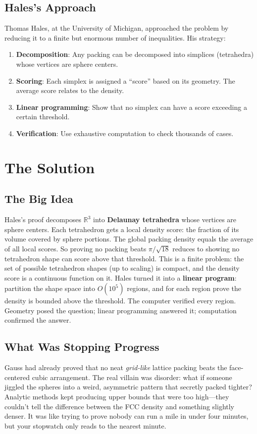 \subsection{Hales's Approach}

Thomas Hales, at the University of Michigan, approached the problem by reducing it to a finite but enormous number of inequalities. His strategy:

\begin{enumerate}
\item \textbf{Decomposition}: Any packing can be decomposed into simplices (tetrahedra) whose vertices are sphere centers.
\item \textbf{Scoring}: Each simplex is assigned a ``score'' based on its geometry. The average score relates to the density.
\item \textbf{Linear programming}: Show that no simplex can have a score exceeding a certain threshold.
\item \textbf{Verification}: Use exhaustive computation to check thousands of cases.
\end{enumerate}

\section{The Solution}

\subsection{The Big Idea}
Hales's proof decomposes $\mathbb{R}^3$ into \textbf{Delaunay tetrahedra} whose vertices are sphere centers. Each tetrahedron gets a local density score: the fraction of its volume covered by sphere portions. The global packing density equals the average of all local scores. So proving no packing beats $\pi/\sqrt{18}$ reduces to showing no tetrahedron shape can score above that threshold. This is a finite problem: the set of possible tetrahedron shapes (up to scaling) is compact, and the density score is a continuous function on it. Hales turned it into a \textbf{linear program}: partition the shape space into $O(10^5)$ regions, and for each region prove the density is bounded above the threshold. The computer verified every region. Geometry posed the question; linear programming answered it; computation confirmed the answer.

\subsection{What Was Stopping Progress}
Gauss had already proved that no neat \emph{grid-like} lattice packing beats the face-centered cubic arrangement. The real villain was disorder: what if someone jiggled the spheres into a weird, asymmetric pattern that secretly packed tighter? Analytic methods kept producing upper bounds that were too high---they couldn't tell the difference between the FCC density and something slightly denser. It was like trying to prove nobody can run a mile in under four minutes, but your stopwatch only reads to the nearest minute.


